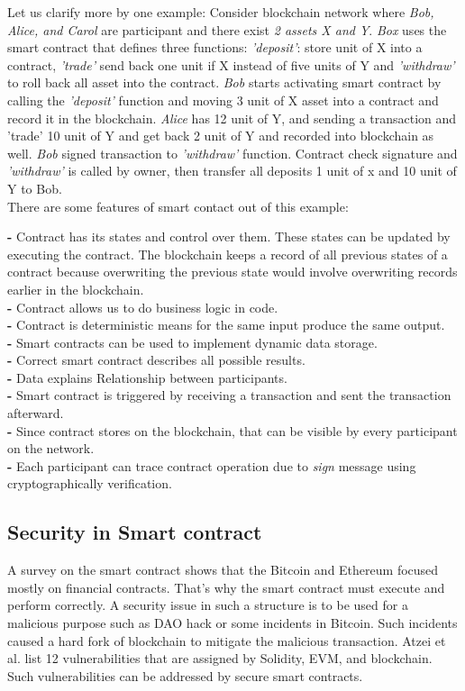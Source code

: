 Let us clarify more by one example:
Consider blockchain network where \textit{Bob, Alice, and Carol} are participant and there exist \textit{2 assets X and Y}. \textit{Box} uses the smart contract that defines three functions: \textit{'deposit'}: store unit of X into a contract, \textit{'trade'} send back one unit if X instead of five units of Y  and \textit{'withdraw'} to roll back all asset into the contract.
\textit{Bob} starts activating smart contract by calling the \textit{'deposit'} function and moving 3 unit of X asset into a contract and record it in the blockchain. \textit{Alice} has 12 unit of Y, and sending a transaction and 'trade' 10 unit of Y and get back 2 unit of Y and recorded into blockchain as well. \textit{Bob} signed transaction to \textit{'withdraw'} function. Contract check signature and \textit{'withdraw'} is called by owner, then transfer all deposits 1 unit of x and 10 unit of Y to Bob\cite{Christidis}.\\
There are some features of smart contact out of this example:

\textbf{-} Contract has its states and control over them. These states can be updated by executing the contract. The blockchain keeps a record of all previous states of a contract because overwriting the previous state would involve overwriting records earlier in the blockchain.\\
\textbf{-} Contract allows us to do business logic in code. \\
\textbf{-} Contract is deterministic means for the same input produce the same output.\\
\textbf{-} Smart contracts can be used to implement dynamic data storage.\\
\textbf{-} Correct smart contract describes all possible results.\\
\textbf{-} Data explains Relationship between participants.\\
\textbf{-} Smart contract is triggered by receiving a transaction and sent the transaction afterward.\\
\textbf{-} Since contract stores on the blockchain, that can be visible by every participant on the network.\\
\textbf{-} Each participant can trace contract operation due to \textit{sign} message using cryptographically verification.\\

\subsection{Security in Smart contract}
A survey on the smart contract shows that the Bitcoin and Ethereum focused mostly on financial contracts. That's why the smart contract must execute and perform correctly. 
A security issue in such a structure is to be used for a malicious purpose such as DAO hack or some incidents in Bitcoin. Such incidents 
caused a hard fork of blockchain to mitigate the malicious transaction.
Atzei et al. list 12 vulnerabilities that are assigned by Solidity, EVM, and blockchain. Such vulnerabilities can be addressed by secure smart contracts\cite{Zdun}.
